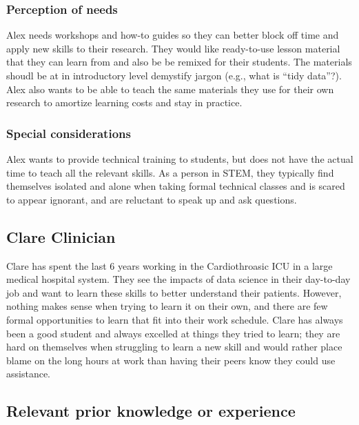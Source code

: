 \documentclass[020-persona\_validation.tex]{subfiles}
\begin{document}
        \subsubsection{Perception of needs}

            Alex needs workshops and how-to guides so they can better block off time and apply new skills to their research.
            They would like ready-to-use lesson material that they can learn from and also be be remixed for their students.
            The materials shoudl be at in introductory level demystify jargon (e.g., what is ``tidy data''?).
            Alex also wants to be able to teach the same materials they use for their own research
            to amortize learning costs and stay in practice.

        \subsubsection{Special considerations}

            Alex wants to provide technical training to students,
            but does not have the actual time to teach all the relevant skills.
            As a person in STEM,
            they typically find themselves isolated and alone when taking formal technical classes and
            is scared to appear ignorant, and are reluctant to speak up and ask questions.


    \subsection{Clare Clinician}

        Clare has spent the last 6 years working in the Cardiothroasic ICU in a large medical hospital system.
        They see the impacts of data science in their day-to-day job
        and want to learn these skills to better understand their patients.
        However, nothing makes sense when trying to learn it on their own,
        and there are few formal opportunities to learn that fit into their work schedule.
        Clare has always been a good student and always excelled at things they tried to learn;
        they are hard on themselves when struggling to learn a new skill and
        would rather place blame on the long hours at work than having their peers know they could use assistance.

        \subsection{Relevant prior knowledge or experience}
\end{document}
